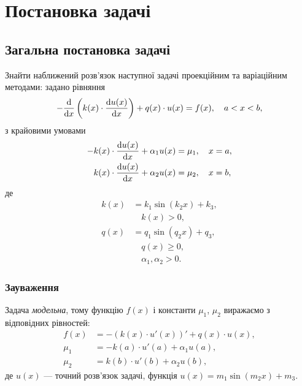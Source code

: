 




\tableofcontents

\section{Постановка задачі}

\subsection{Загальна постановка задачі}

Знайти наближений розв'язок наступної задачі проекційним та варіаційним методами: задано рівняння
\begin{equation}
    \label{eq:1.1}
    - \frac{\mathop{}\!\mathrm{d}}{\mathop{}\!\mathrm{d} x} \left( k(x) \cdot \frac{\mathop{}\!\mathrm{d} u(x)}{\mathop{}\!\mathrm{d} x} \right) + q(x) \cdot u(x) = f(x), \quad a < x < b,
\end{equation}
з крайовими умовами
\begin{align}
    \label{eq:1.2}
    -k(x) \cdot \frac{\mathop{}\!\mathrm{d} u(x)}{\mathop{}\!\mathrm{d} x} + \alpha_1 u(x) &= \mu_1, \quad x = a, \\
    \label{eq:1.3}
    k(x) \cdot \frac{\mathop{}\!\mathrm{d} u(x)}{\mathop{}\!\mathrm{d} x} + \alpha_2 u(x) &= \mu_2, \quad x = b,
\end{align}
де
\begin{align}
    \label{eq:1.4}
    k(x) &= k_1 \sin(k_2 x) + k_3, \\
    & \quad k(x) > 0, \nonumber \\
    \label{eq:1.6}
    q(x) &= q_1 \sin(q_2 x) + q_3, \\
    & \quad q(x) \ge 0, \nonumber \\
    & \quad \alpha_1, \alpha_2 > 0. \nonumber
\end{align}

\subsubsection{Зауваження}

Задача \emph{модельна}, тому функцію $f(x)$ і константи $\mu_1$, $\mu_2$ виражаємо з відповідних рівностей:
\begin{align}
    \label{eq:1.7}
    f(x) &= -(k(x) \cdot u'(x))' + q(x) \cdot u(x), \\
    \label{eq:1.8}
    \mu_1 &= -k(a) \cdot u'(a) + \alpha_1 u(a), \\
    \label{eq:1.9}
    \mu_2 &= k(b) \cdot u'(b) + \alpha_2 u(b),
\end{align}
де $u(x)$ --- точний розв'язок задачі, функція $u(x) = m_1 \sin(m_2 x) + m_3$.

